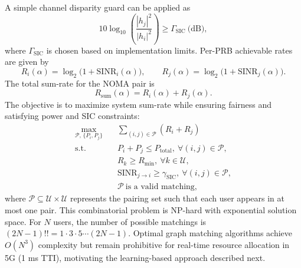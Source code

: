 \documentclass[conference]{IEEEtran}
\begin{document}
A simple channel disparity guard can be applied as
\begin{equation}
10 \log_{10}\!\left( \frac{|h_j|^2}{|h_i|^2} \right)
\ge
\Gamma_{\mathrm{SIC}} \ \text{(dB)},
\end{equation}
where $\Gamma_{\mathrm{SIC}}$ is chosen based on implementation limits.
Per-PRB achievable rates are given by
\begin{equation}
R_i(\alpha) = \log_2\!\big(1 + \mathrm{SINR}_i(\alpha)\big), \qquad
R_j(\alpha) = \log_2\!\big(1 + \mathrm{SINR}_j(\alpha)\big).
\end{equation}
The total sum-rate for the NOMA pair is
\begin{equation}
R_{\mathrm{sum}}(\alpha) = R_i(\alpha) + R_j(\alpha).
\end{equation}
The objective is to maximize system sum-rate while ensuring fairness and satisfying power and SIC constraints:
\begin{equation}
\begin{aligned}
\max_{\mathcal{P},\,\{P_i,P_j\}} \quad & \sum_{(i,j)\in\mathcal{P}} (R_i + R_j) \\
\text{s.t.} \quad &
P_i + P_j \leq P_{\text{total}}, \ \forall (i,j)\in\mathcal{P}, \\
& R_k \geq R_{\min}, \ \forall k\in\mathcal{U}, \\
& \text{SINR}_{j \to i} \geq \gamma_{\text{SIC}}, \ \forall (i,j)\in\mathcal{P}, \\
& \mathcal{P}\ \text{is a valid matching},
\end{aligned}
\end{equation}
where $\mathcal{P} \subseteq \mathcal{U} \times \mathcal{U}$ represents the pairing set such that each user appears in at most one pair. This combinatorial problem is NP-hard with exponential solution space. For $N$ users, the number of possible matchings is $(2N-1)!! = 1 \cdot 3 \cdot 5 \cdots (2N-1)$. Optimal graph matching algorithms \cite{edmonds1965,kuhn1955} achieve $O(N^3)$ complexity but remain prohibitive for real-time resource allocation in 5G (1 ms TTI), motivating the learning-based approach described next.
\end{document}
